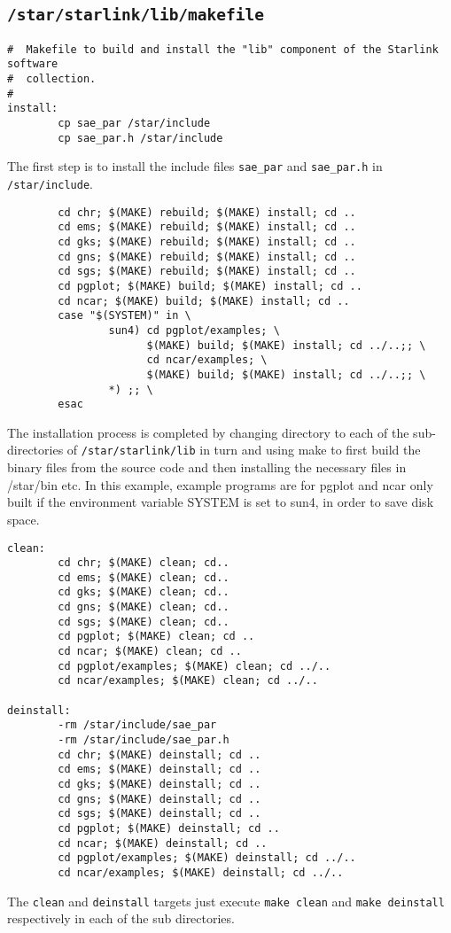 \subsection{\tt /star/starlink/lib/makefile}
\begin{verbatim}
#  Makefile to build and install the "lib" component of the Starlink software
#  collection.
#
install:
        cp sae_par /star/include
        cp sae_par.h /star/include
\end{verbatim}
The first step is to install the include files {\tt sae\_par} and 
{\tt sae\_par.h} in {\tt/star/include}.
\begin{verbatim}
        cd chr; $(MAKE) rebuild; $(MAKE) install; cd ..
        cd ems; $(MAKE) rebuild; $(MAKE) install; cd ..
        cd gks; $(MAKE) rebuild; $(MAKE) install; cd ..
        cd gns; $(MAKE) rebuild; $(MAKE) install; cd ..
        cd sgs; $(MAKE) rebuild; $(MAKE) install; cd ..
        cd pgplot; $(MAKE) build; $(MAKE) install; cd ..
        cd ncar; $(MAKE) build; $(MAKE) install; cd ..
        case "$(SYSTEM)" in \
                sun4) cd pgplot/examples; \
                      $(MAKE) build; $(MAKE) install; cd ../..;; \
                      cd ncar/examples; \
                      $(MAKE) build; $(MAKE) install; cd ../..;; \
                *) ;; \
        esac
\end{verbatim}
The installation process is completed by changing directory to each of the
sub-directories of {\tt /star\-/starlink\-/lib} in turn and using make to first
build the binary files from the source code and then installing the necessary
files in {/star/bin} etc. In this example, example programs are for pgplot and
ncar only built if the environment variable SYSTEM is set to sun4, in order to 
save disk space.
\begin{verbatim}
clean:
        cd chr; $(MAKE) clean; cd..
        cd ems; $(MAKE) clean; cd..
        cd gks; $(MAKE) clean; cd..
        cd gns; $(MAKE) clean; cd..
        cd sgs; $(MAKE) clean; cd..
        cd pgplot; $(MAKE) clean; cd ..
        cd ncar; $(MAKE) clean; cd ..
        cd pgplot/examples; $(MAKE) clean; cd ../..
        cd ncar/examples; $(MAKE) clean; cd ../..

deinstall:
        -rm /star/include/sae_par 
        -rm /star/include/sae_par.h
        cd chr; $(MAKE) deinstall; cd ..
        cd ems; $(MAKE) deinstall; cd ..
        cd gks; $(MAKE) deinstall; cd ..
        cd gns; $(MAKE) deinstall; cd ..
        cd sgs; $(MAKE) deinstall; cd ..
        cd pgplot; $(MAKE) deinstall; cd ..
        cd ncar; $(MAKE) deinstall; cd ..
        cd pgplot/examples; $(MAKE) deinstall; cd ../..
        cd ncar/examples; $(MAKE) deinstall; cd ../..

 \end{verbatim}
The {\tt clean} and {\tt deinstall} targets just execute  {\tt make clean} 
and {\tt make deinstall} respectively in each of the sub
directories.

